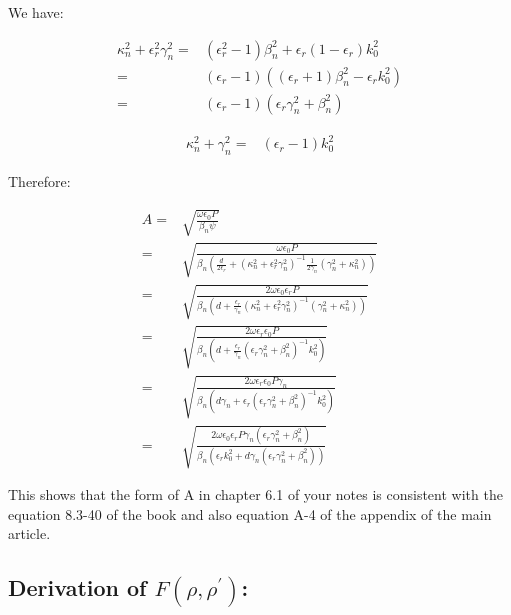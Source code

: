 \documentclass[11pt, oneside]{article}   	%
\begin{document}
We have:

\begin{align*}
\kappa_{n}^{2}+\epsilon_{r}^{2}\gamma_{n}^{2}= & \left(\epsilon_{r}^{2}-1\right)\beta_{n}^{2}+\epsilon_{r}\left(1-\epsilon_{r}\right)k_{0}^{2}\\
= & \left(\epsilon_{r}-1\right)\left(\left(\epsilon_{r}+1\right)\beta_{n}^{2}-\epsilon_{r}k_{0}^{2}\right)\\
= & \left(\epsilon_{r}-1\right)\left(\epsilon_{r}\gamma_{n}^{2}+\beta_{n}^{2}\right)
\end{align*}


\begin{align*}
\kappa_{n}^{2}+\gamma_{n}^{2}= & \left(\epsilon_{r}-1\right)k_{0}^{2}
\end{align*}


Therefore: 

\begin{align*}
A= & \sqrt{\frac{\omega\epsilon_{0}P}{\beta_{n}\psi}}\\
= & \sqrt{\frac{\omega\epsilon_{0}P}{\beta_{n}\left(\frac{d}{2\epsilon_{r}}+\left(\kappa_{n}^{2}+\epsilon_{r}^{2}\gamma_{n}^{2}\right)^{-1}\frac{1}{2\gamma_{n}}\left(\gamma_{n}^{2}+\kappa_{n}^{2}\right)\right)}}\\
= & \sqrt{\frac{2\omega\epsilon_{0}\epsilon_{r}P}{\beta_{n}\left(d+\frac{\epsilon_{r}}{\gamma_{n}}\left(\kappa_{n}^{2}+\epsilon_{r}^{2}\gamma_{n}^{2}\right)^{-1}\left(\gamma_{n}^{2}+\kappa_{n}^{2}\right)\right)}}\\
= & \sqrt{\frac{2\omega\epsilon_{r}\epsilon_{0}P}{\beta_{n}\left(d+\frac{\epsilon_{r}}{\gamma_{n}}\left(\epsilon_{r}\gamma_{n}^{2}+\beta_{n}^{2}\right)^{-1}k_{0}^{2}\right)}}\\
= & \sqrt{\frac{2\omega\epsilon_{r}\epsilon_{0}P\gamma_{n}}{\beta_{n}\left(d\gamma_{n}+\epsilon_{r}\left(\epsilon_{r}\gamma_{n}^{2}+\beta_{n}^{2}\right)^{-1}k_{0}^{2}\right)}}\\
= & \sqrt{\frac{2\omega\epsilon_{0}\epsilon_{r}P\gamma_{n}\left(\epsilon_{r}\gamma_{n}^{2}+\beta_{n}^{2}\right)}{\beta_{n}\left(\epsilon_{r}k_{0}^{2}+d\gamma_{n}\left(\epsilon_{r}\gamma_{n}^{2}+\beta_{n}^{2}\right)\right)}}
\end{align*}


This shows that the form of A in chapter 6.1 of your notes is consistent
with the equation 8.3-40 of the book and also equation A-4 of the
appendix of the main article.


\subsection{Derivation of $F\left(\rho,\rho^{\prime}\right)$:}
\end{document}
